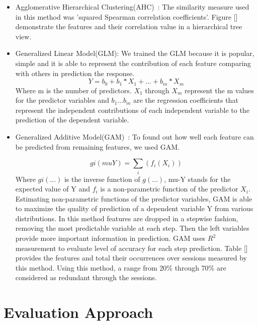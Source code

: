\begin{itemize}
  \item Agglomerative Hierarchical Clustering(AHC)~\cite{WIDM:WIDM1219}:  The similarity measure used in this method was 'squared Spearman correlation coefficients'. Figure [] demonstrate the features and their correlation value in a hierarchical tree view.

   \item Generalized Linear Model(GLM): We trained the GLM because it is popular, simple and it is able to represent the contribution of each feature comparing with others in prediction the response.
        \begin{equation}
        \label{glm_equ}
        Y= b_0 + b_1*X_1+ ... + b_m*X_m
        \end{equation}
Where m is the number of predictors. $X_1$ through $X_m$ represent the m values for the predictor variables and $b_1 \ldots b_m$ are the regression coefficients that represent the independent contributions of each independent variable to the prediction of the dependent variable.

\item Generalized Additive Model(GAM)~\cite{wood2017generalized}: To found out how well each feature can be predicted from remaining features, we used GAM.    
    
       \begin{equation}
        gi(muY)=\sum_{i}(f_{i}(X_{i}))
       \end{equation}
       Where $gi(\ldots)$ is the inverse function of $g(\ldots)$, mu-Y stands for the expected value of Y and  $f_{i}$ is a non-parametric function of the predictor $X_{i}$. Estimating non-parametric functions of the predictor variables, GAM is able to maximize the quality of prediction of a dependent variable Y from various distributions. In this method features are dropped in a stepwise fashion, removing the most predictable variable at each step. Then the left variables provide more important information in prediction. GAM uses $R^{2}$ measurement to evaluate level of accuracy for each step prediction. Table [] provides the features and total their occurrences over sessions measured by this method. Using this method, a range from 20\% through 70\% are considered as redundant through the sessions.
\end{itemize}

\section{Evaluation Approach}

